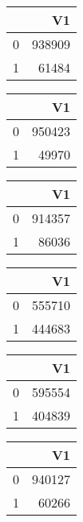 \bigskip\bigskip
\centering
\begin{tabular}{rr}
  \hline
 & V1 \\ 
  \hline
0 & 938909 \\ 
  1 & 61484 \\ 
   \hline
\end{tabular}

\bigskip\bigskip
\centering
\begin{tabular}{rr}
  \hline
 & V1 \\ 
  \hline
0 & 950423 \\ 
  1 & 49970 \\ 
   \hline
\end{tabular}

\bigskip\bigskip
\centering
\begin{tabular}{rr}
  \hline
 & V1 \\ 
  \hline
0 & 914357 \\ 
  1 & 86036 \\ 
   \hline
\end{tabular}

\bigskip\bigskip
\centering
\begin{tabular}{rr}
  \hline
 & V1 \\ 
  \hline
0 & 555710 \\ 
  1 & 444683 \\ 
   \hline
\end{tabular}

\bigskip\bigskip
\centering
\begin{tabular}{rr}
  \hline
 & V1 \\ 
  \hline
0 & 595554 \\ 
  1 & 404839 \\ 
   \hline
\end{tabular}

\bigskip\bigskip
\centering
\begin{tabular}{rr}
  \hline
 & V1 \\ 
  \hline
0 & 940127 \\ 
  1 & 60266 \\ 
   \hline
\end{tabular}

